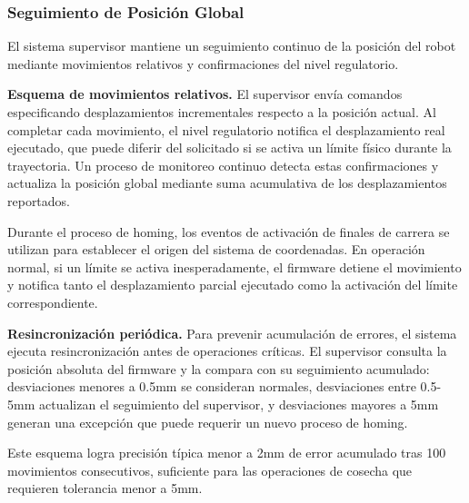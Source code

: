 \subsubsection{Seguimiento de Posición Global}

El sistema supervisor mantiene un seguimiento continuo de la posición del robot mediante movimientos relativos y confirmaciones del nivel regulatorio.

\textbf{Esquema de movimientos relativos.} El supervisor envía comandos especificando desplazamientos incrementales respecto a la posición actual. Al completar cada movimiento, el nivel regulatorio notifica el desplazamiento real ejecutado, que puede diferir del solicitado si se activa un límite físico durante la trayectoria. Un proceso de monitoreo continuo detecta estas confirmaciones y actualiza la posición global mediante suma acumulativa de los desplazamientos reportados.

Durante el proceso de homing, los eventos de activación de finales de carrera se utilizan para establecer el origen del sistema de coordenadas. En operación normal, si un límite se activa inesperadamente, el firmware detiene el movimiento y notifica tanto el desplazamiento parcial ejecutado como la activación del límite correspondiente.

\textbf{Resincronización periódica.} Para prevenir acumulación de errores, el sistema ejecuta resincronización antes de operaciones críticas. El supervisor consulta la posición absoluta del firmware y la compara con su seguimiento acumulado: desviaciones menores a 0.5mm se consideran normales, desviaciones entre 0.5-5mm actualizan el seguimiento del supervisor, y desviaciones mayores a 5mm generan una excepción que puede requerir un nuevo proceso de homing.

Este esquema logra precisión típica menor a 2mm de error acumulado tras 100 movimientos consecutivos, suficiente para las operaciones de cosecha que requieren tolerancia menor a 5mm.
